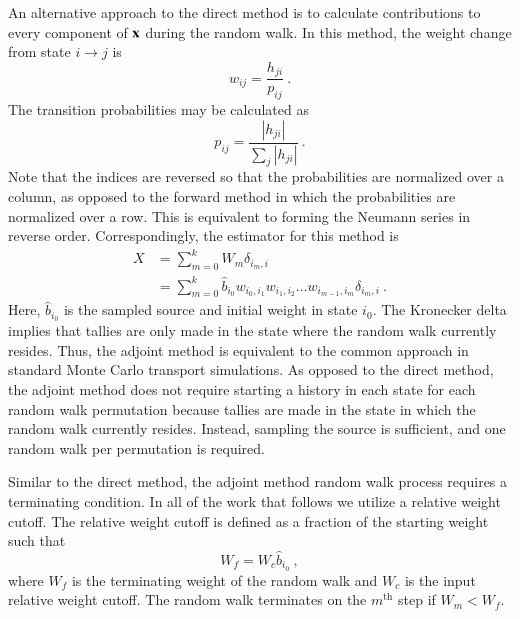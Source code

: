 \documentclass[preprint,12pt]{elsarticle}
\newcommand{\vx}{\ensuremath{\ve{x}}}
\begin{document}
An alternative approach to the direct method is to calculate contributions to
every component of $\vx$ during the random walk. In this method, the weight
change from state $i\rightarrow j$ is
\begin{equation}
  w_{ij} = \frac{h_{ji}}{p_{ij}}\:.
  \label{eq:adjoint-weight}
\end{equation}
The transition probabilities may be calculated as
\begin{equation}
  p_{ij} = \frac{|h_{ji}|}{\sum_{j}|h_{ji}|}\:.
  \label{eq:adjoint-probability}
\end{equation}
Note that the indices are reversed so that the probabilities are normalized
over a column, as opposed to the forward method in which the probabilities are
normalized over a row.  This is equivalent to forming the Neumann series in
reverse order.  Correspondingly, the estimator for this method is
\begin{equation}
  \begin{split}
    X &= \sum_{m=0}^{k}W_m\delta_{i_m,i}\\ &=
    \sum_{m=0}^{k}\hat{b}_{i_0}w_{i_0,i_1}w_{i_1,i_2}\ldots
    w_{i_{m-1},i_m}\delta_{i_m,i}\:.
  \end{split}
  \label{eq:adjoint-tally}
\end{equation}
Here, $\hat{b}_{i_0}$ is the sampled source and initial weight in state $i_0$.
The Kronecker delta implies that tallies are only made in the state where the
random walk currently resides.  Thus, the adjoint method is equivalent to the
common approach in standard Monte Carlo transport simulations. As opposed to
the direct method, the adjoint method does not require starting a history in
each state for each random walk permutation because tallies are made in the
state in which the random walk currently resides. Instead, sampling the source
is sufficient, and one random walk per permutation is required.

Similar to the direct method, the adjoint method random walk process
requires a terminating condition.  In all of the work that follows we
utilize a relative weight cutoff.  The relative weight cutoff is
defined as a fraction of the starting weight such that
\begin{equation}
  W_f = W_c\hat{b}_{i_0}\:,
  \label{eq:weight_cutoff}
\end{equation}
where $W_f$ is the terminating weight of the random walk and $W_c$ is
the input relative weight cutoff. The random walk terminates on the
$m^\text{th}$ step if $W_m < W_f$.
\end{document}
